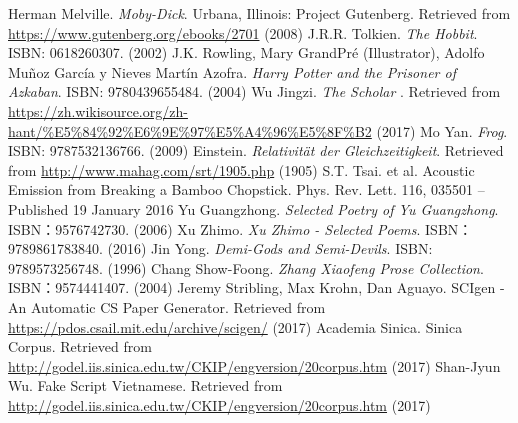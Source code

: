 \documentclass[a4paper]{article}
\begin{document}
\begin{CJK}{UTF8}{bsmi}
\begin{thebibliography}{}
	 Herman Melville. {\it Moby-Dick}. Urbana, Illinois: Project Gutenberg. Retrieved  from \url{https://www.gutenberg.org/ebooks/2701} (2008)
	 J.R.R. Tolkien. {\it The Hobbit}. ISBN: 0618260307. (2002)
	 J.K. Rowling,  Mary GrandPré (Illustrator), Adolfo Muñoz García y Nieves Martín Azofra. {\it Harry Potter and the Prisoner of Azkaban}. ISBN: 9780439655484. (2004)
	 Wu Jingzi. {\it The Scholar} . Retrieved from \url{https://zh.wikisource.org/zh-hant/%E5%84%92%E6%9E%97%E5%A4%96%E5%8F%B2} (2017)
	 Mo Yan. {\it Frog}. ISBN: 9787532136766. (2009)
	 Einstein. {\it Relativität der
		Gleichzeitigkeit}. Retrieved from \url{http://www.mahag.com/srt/1905.php} (1905)
	 S.T. Tsai. et al. Acoustic Emission from Breaking a Bamboo Chopstick. Phys. Rev. Lett. 116, 035501 – Published 19 January 2016
	 Yu Guangzhong. {\it Selected Poetry of Yu Guangzhong}. ISBN：9576742730. (2006)
	 Xu Zhimo. {\it Xu Zhimo - Selected Poems}. ISBN：9789861783840. (2016)
	 Jin Yong. {\it Demi-Gods and Semi-Devils}. ISBN: 9789573256748. (1996)
	 Chang Show-Foong. {\it Zhang Xiaofeng Prose Collection}. ISBN：9574441407. (2004)
	 Jeremy Stribling, Max Krohn, Dan Aguayo. SCIgen - An Automatic CS Paper Generator.  Retrieved from \url{https://pdos.csail.mit.edu/archive/scigen/} (2017)
	 Academia Sinica.  Sinica Corpus. Retrieved  from \url{http://godel.iis.sinica.edu.tw/CKIP/engversion/20corpus.htm} (2017)
	 Shan-Jyun Wu. Fake Script Vietnamese. Retrieved  from \url{http://godel.iis.sinica.edu.tw/CKIP/engversion/20corpus.htm} (2017)
\end{thebibliography}
\end{CJK}
\end{document}
